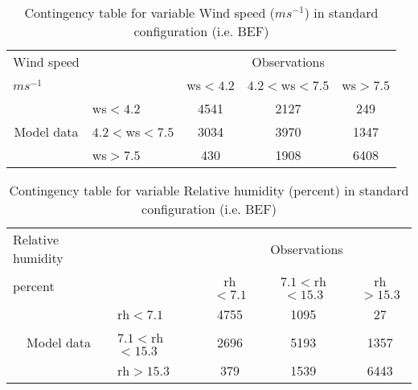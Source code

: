 \documentclass[11pt,english]{article}
\begin{document}
\begin{table}[]
\begin{center}
\begin{tabular}{llccc}
\hline
{Wind speed}                                       &                                                    & \multicolumn{3}{c}{Observations}                 \\
{$m s^{-1}$}                                       &                             & ws$<4.2$   & $4.2<$ws$<7.5$ & ws$>7.5$ \\
\hline
\multicolumn{1}{c}{\multirow{3}{*}{Model data}}  & ws$<4.2$          & 4541                & 2127                       & 249              \\
                                                 & $4.2<$ws$<7.5$ & 3034                & 3970                       & 1347              \\
                                                 & ws$>7.5$          & 430                & 1908                       & 6408              \\
\hline
\end{tabular}
\end{center}
\caption{Contingency table for variable Wind speed ($m s^{-1}$) in standard configuration (i.e. BEF)}
\label{tab:contingency}
\end{table}

\begin{table}[]
\begin{center}
\begin{tabular}{llccc}
\hline
{Relative humidity}                                       &                                                    & \multicolumn{3}{c}{Observations}                 \\
{percent}                                       &                             & rh$<7.1$   & $7.1<$rh$<15.3$ & rh$>15.3$ \\
\hline
\multicolumn{1}{c}{\multirow{3}{*}{Model data}}  & rh$<7.1$          & 4755                & 1095                       & 27              \\
                                                 & $7.1<$rh$<15.3$ & 2696                & 5193                       & 1357              \\
                                                 & rh$>15.3$          & 379                & 1539                       & 6443              \\
\hline
\end{tabular}
\end{center}
\caption{Contingency table for variable Relative humidity (percent) in standard configuration (i.e. BEF)}
\label{tab:contingency}
\end{table}
\end{document}
